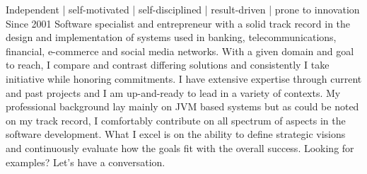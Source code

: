 

\begin{cventries}
  \cventry
    {} %
    {Independent | self-motivated | self-disciplined | result-driven | prone to innovation}
    {} %
    {Since 2001} %
    {
      Software specialist and entrepreneur with a solid track record in the  design and implementation of systems
      used in banking, telecommunications, financial, e-commerce and social media networks.
      With a given domain and  goal to reach, I compare and contrast differing solutions and consistently I take
      initiative while honoring commitments. I have extensive expertise through current and past projects and I am up-and-ready
      to lead in a variety of contexts. My professional background lay mainly on JVM based systems but as could
      be noted on my track record, I comfortably contribute on all spectrum of aspects in the software development.
      What I excel is on the ability to define strategic visions and continuously evaluate how the goals fit with
      the overall success. Looking for examples? Let's have a conversation.
    }


\end{cventries}
